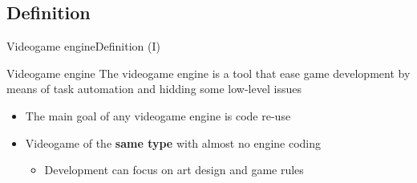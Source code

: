\documentclass[10pt,compress]{beamer} %
\begin{document}
\subsection{Definition}
\begin{frame}{Videogame engine}{Definition (I)}
	\vspace{-0.1cm}
	\begin{block}{Videogame engine}
	The videogame engine is a tool that ease game development by means of task automation and hidding some low-level issues
	\end{block}

	\vspace{-0.1cm}
	\begin{itemize}
		\item The main goal of any videogame engine is code re-use
		\item Videogame of the \textbf{same type} with almost no engine coding
		\begin{itemize}
		\item Development can focus on art design and game rules
		\end{itemize}
	\end{itemize}


\end{frame}
\end{document}
